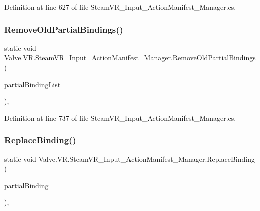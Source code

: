 Definition at line 627 of file Steam\+V\+R\+\_\+\+Input\+\_\+\+Action\+Manifest\+\_\+\+Manager.\+cs.

\mbox{\label{class_valve_1_1_v_r_1_1_steam_v_r___input___action_manifest___manager_ac5a5b25cfebab833ec996fc78538af5f}} 
\subsubsection{\texorpdfstring{RemoveOldPartialBindings()}{RemoveOldPartialBindings()}}
{\footnotesize\ttfamily static void Valve.\+V\+R.\+Steam\+V\+R\+\_\+\+Input\+\_\+\+Action\+Manifest\+\_\+\+Manager.\+Remove\+Old\+Partial\+Bindings (\begin{DoxyParamCaption}\item[{List$<$ \mbox{\hyperlink{class_valve_1_1_v_r_1_1_steam_v_r___partial_input_bindings}{Steam\+V\+R\+\_\+\+Partial\+Input\+Bindings}} $>$}]{partial\+Binding\+List }\end{DoxyParamCaption})\hspace{0.3cm}{\ttfamily [static]}, {\ttfamily [protected]}}



Definition at line 737 of file Steam\+V\+R\+\_\+\+Input\+\_\+\+Action\+Manifest\+\_\+\+Manager.\+cs.

\mbox{\label{class_valve_1_1_v_r_1_1_steam_v_r___input___action_manifest___manager_a5f6546aff673b524166ecf396e62a696}} 
\subsubsection{\texorpdfstring{ReplaceBinding()}{ReplaceBinding()}}
{\footnotesize\ttfamily static void Valve.\+V\+R.\+Steam\+V\+R\+\_\+\+Input\+\_\+\+Action\+Manifest\+\_\+\+Manager.\+Replace\+Binding (\begin{DoxyParamCaption}\item[{\mbox{\hyperlink{class_valve_1_1_v_r_1_1_steam_v_r___partial_input_bindings}{Steam\+V\+R\+\_\+\+Partial\+Input\+Bindings}}}]{partial\+Binding }\end{DoxyParamCaption})\hspace{0.3cm}{\ttfamily [static]}, {\ttfamily [protected]}}




